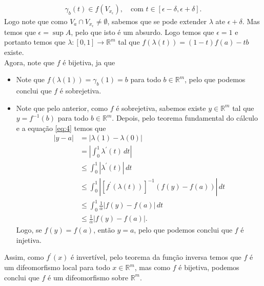 \begin{homeworkProblem}[Seção 1-9]
\begin{solution}
      \begin{align*}
        \gamma_{b}(t)\in f\left( V_{x_{\epsilon}} \right),\quad\text{com }t\in[\epsilon-\delta,\epsilon+\delta].
      \end{align*}
      Logo note que como $V_{a}\cap V_{x_{\epsilon}}\neq\emptyset$, sabemos que se pode extender $\lambda$ ate $\epsilon+\delta$. Mas temos que $\epsilon=\sup A$, pelo que isto é  um absurdo. Logo temos que $\epsilon=1$ e portanto temos que $\lambda:[0,1]\to\mathbb{R}^{m}$ tal que $f(\lambda(t))=(1-t)f(a)-tb$ existe.\\
      Agora, note que $f$ é bijetiva, ja que 
      \begin{itemize}
        \item Note que $f(\lambda(1))=\gamma_b(1)=b$ para todo $b\in \mathbb{R}^{m}$, pelo que podemos conclui que $f$ é sobrejetiva.
        \item Note que pelo anterior, como $f$ é sobrejetiva, sabemos existe $y\in\mathbb{R}^{m}$ tal que $y=f^{-1}(b)$ para todo $b\in\mathbb{R}^{m}$. Depois, pelo teorema fundamental do cálculo e a equação \eqref{eq:4} temos que
          \begin{align*}
            \left| y-a \right|&=\left| \lambda(1)-\lambda(0) \right|\\
            &= \left| \int_{0}^{1}\lambda^{\prime}(t)\,dt \right|\\
            &\leq \int_{0}^{1}\left| \lambda^{\prime}(t) \right|\,dt\\
            &\leq \int_{0}^{1}\left| \left[ f^{\prime}(\lambda(t)) \right]^{-1}(f(y)-f(a)) \right|\,dt\\
            &\leq \int_{0}^{1}\frac{1}{\alpha}\left| f(y)-f(a) \right|\,dt\\
            &\leq \frac{1}{\alpha}\left| f(y)-f(a) \right|.
          \end{align*}
          Logo, se $f(y)=f(a)$, então $y=a$, pelo que podemos conclui que $f$ é injetiva. 
      \end{itemize}
      Assim, como $f^{\prime}(x)$ é invertível, pelo teorema da função inversa temos que $f$ é um difeomorfismo local para todo  $x\in\mathbb{R}^{m}$, mas como $f$ é bijetiva, podemos conclui que $f$ é um difeomorfismo sobre $\mathbb{R}^{m}$. 
  \end{solution}
\end{homeworkProblem}

